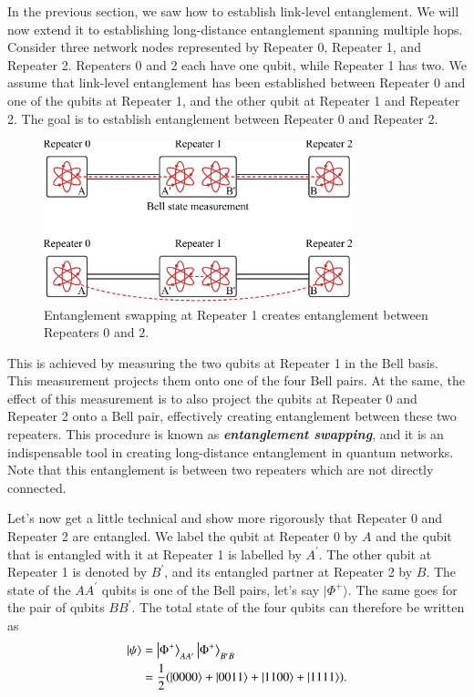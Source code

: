 In the previous section, we saw how to establish link-level entanglement.
We will now extend it to establishing long-distance entanglement spanning multiple hops.
Consider three network nodes represented by Repeater 0, Repeater 1, and Repeater 2. Repeaters 0 and 2 each have one qubit, while Repeater 1 has two.
We assume that link-level entanglement has been established between Repeater 0 and one of the qubits at Repeater 1, and the other qubit at Repeater 1 and Repeater 2.
The goal is to establish entanglement between Repeater 0 and Repeater 2.

\begin{figure}[t]
    \centering
    \includegraphics[width=0.8\textwidth]{lesson12/12-3_entanglement_swapping.pdf}
    \caption[Entanglement swapping]{Entanglement swapping at Repeater 1 creates entanglement between Repeaters 0 and 2.}
    \label{fig:12-3_entanglement_swapping}
\end{figure}

This is achieved by measuring the two qubits at Repeater 1 in the Bell basis.
This measurement projects them onto one of the four Bell pairs.
At the same, the effect of this measurement is to also project the qubits at Repeater 0 and Repeater 2 onto a Bell pair, effectively creating entanglement between these two repeaters.
This procedure is known as \textit{\textbf{entanglement swapping}}, and it is an indispensable tool in creating long-distance entanglement in quantum networks.
Note that this entanglement is between two repeaters which are not directly connected.

Let's now get a little technical and show more rigorously that Repeater 0 and Repeater 2 are entangled.
We label the qubit at Repeater 0 by $A$ and the qubit that is entangled with it at Repeater 1 is labelled by $A^{\prime}$.
The other qubit at Repeater 1 is denoted by $B^{\prime}$, and its entangled partner at Repeater 2 by $B$.
The state of the $AA^{\prime}$ qubits is one of the Bell pairs, let's say $|\Phi^+\rangle$.
The same goes for the pair of qubits $BB^{\prime}$.
The total state of the four qubits can therefore be written as
\begin{align}
    \begin{aligned}
        \ket{\psi} & = \ket{\Phi^{+}}_{A A^{\prime}}\ket{\Phi^{+}}_{B^{\prime} B} \\
        & = \frac{1}{2} ( |0000\rangle+|0011\rangle+|1100\rangle+|1111\rangle ).
        \label{eq:12-3_computational_basis}
    \end{aligned}
\end{align}

